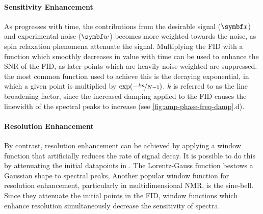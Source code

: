 \paragraph{Sensitivity Enhancement} As  progresses with time, the
contributions from the desirable signal ($\bx$) and experimental noise ($\bw$)
becomes more weighted towards the noise, as spin relaxation phenomena attenuate
the signal.  Multiplying the \ac{FID} with a function which smoothly decreases
in value with time can be used to enhance the \ac{SNR} of the \ac{FID}, as
later points which are heavily noise-weighted are suppressed.
\label{corr:exp-apod} the most common function used to
achieve this is the decaying exponential, in which a given point is multiplied
by $\exp(-\nicefrac{k n}{N - 1})$.  $k$ is referred to as the line broadening
factor, since the increased damping applied to the \ac{FID} causes the
linewidth of the spectral peaks to increase (see
\cref{fig:amp-phase-freq-damp}.d).

\paragraph{Resolution Enhancement} By contrast, resolution enhancement can be
achieved by applying a window function that artificially reduces the rate of
signal decay. It is possible to do this by attenuating the initial datapoints in
. The Lorentz-Gauss function bestows a Gaussian shape to spectral peaks,
\label{corr:gaussian} Another popular window
function for resolution enhancement, particularly in multidimensional \ac{NMR},
is the sine-bell.
Since they attenuate the initial points in the \ac{FID}, window functions which
enhance resolution simultaneously decrease the sensitivity of spectra.

\label{corr:trunc}

